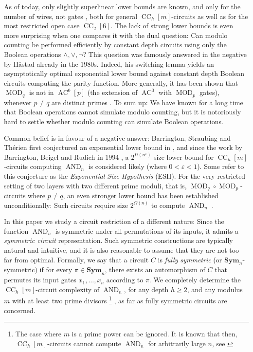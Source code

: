 \documentclass[11pt]{article}
\DeclareMathOperator{\MOD}{MOD}
\DeclareMathOperator{\AND}{AND}
\newcommand{\Sym}{\mathbf{Sym}}
\theoremstyle{definition}
\theoremstyle{plain}
\theoremstyle{remark}
\theoremstyle{remark}
\renewcommand{\epsilon}{\varepsilon}
\DeclareMathOperator{\CC}{CC}
\DeclareMathOperator{\AC}{AC}
\begin{document}
As of today, only slightly superlinear lower bounds are known, and only for the number of wires, not gates \cite{chat-lowerbounds}, both for general $\CC_h[m]$-circuits as well as for the most restricted open case $\CC_2[6]$.
The lack of strong lower bounds is even more surprising when one compares it with the dual question: Can modulo counting be performed  efficiently by constant depth circuits using only the Boolean operations $\land, \lor, \neg$? 
This question was famously answered in the negative by H{\aa}stad \cite{hastadphd} already in the 1980s. Indeed, his switching lemma yields an asymptotically optimal exponential lower bound against constant depth Boolean circuits computing the parity function. 
More generally, it has been shown that $\MOD_q$ is not in $\AC^0[p]$ (the extension of $\AC^0$ with $\MOD_p$ gates), whenever $p \neq q$ are distinct primes \cite{Smo87}.
To sum up: We have known for a long time that Boolean operations cannot simulate modulo counting, but it is notoriously hard to settle whether modulo counting can simulate Boolean operations.

Common belief is in favour of a negative answer: Barrington, Straubing and Thérien first conjectured an exponential lower bound in \cite{BarringtonST90}, and since the work by Barrington, Beigel and Rudich in 1994 \cite{BarringtonBR94}, a $2^{\Omega(n^\epsilon)}$ size lower bound for $\CC_h[m]$-circuits computing $\AND_n$ is considered likely (where $0 < \epsilon < 1$). Some refer to this conjecture as the \emph{Exponential Size Hypothesis} (ESH).
For the very restricted setting of two layers with two different prime moduli, that is, 
$\MOD_{q} \circ \MOD_{p}$-circuits where $p \neq q$, an even stronger lower bound has been established unconditionally: 
Such circuits require size $2^{\Omega(n)}$ to compute $\AND_n$ \cite{GrolmuszT00, Grolmusz01, straubing2006note}. 

In this paper we study a circuit restriction of a different nature: Since the function $\AND_n$ is symmetric under all permutations of its inputs, it admits a \emph{symmetric circuit} representation. Such symmetric constructions are typically natural and intuitive, and it is also reasonable to assume that they are not too far from optimal.
Formally, we say that a circuit $C$ is \emph{fully symmetric} (or $\Sym_n$-symmetric) if for every $\pi \in \Sym_n$, there exists an automorphism of $C$ that permutes its input gates $x_1, \dots, x_n$ according to $\pi$.
We completely determine the $\CC_h[m]$-circuit complexity of $\AND_n$, for any depth $h \geq 2$, and any modulus $m$ with at least two prime divisors \footnote{ The case where $m$ is a prime power can be ignored. It is known that then, $\CC_h[m]$-circuits cannot compute $\AND_n$ for arbitrarily large $n$, see \cite[Proposition 2.1]{IdziakKK22LICS}} , as far as fully symmetric circuits are concerned.
\end{document}
